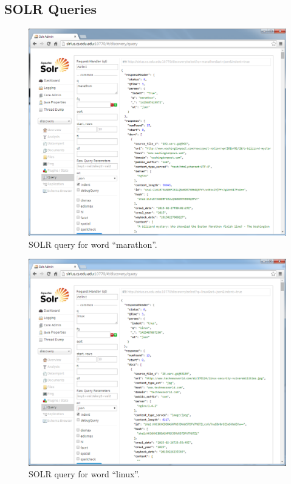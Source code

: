 \documentclass[a4paper,12pt]{article}
\begin{document}
\begin{appendices}
\section{SOLR Queries}
\begin{figure}[H]
    \centering
    \includegraphics[scale=0.5]{images/query_marathon.png}
    \caption{SOLR query for word ``marathon''.}
\end{figure}
\begin{figure}[H]
    \centering
    \includegraphics[scale=0.5]{images/query_linux.png}
    \caption{SOLR query for word ``linux''.}
\end{figure}

\end{appendices}
\end{document}
